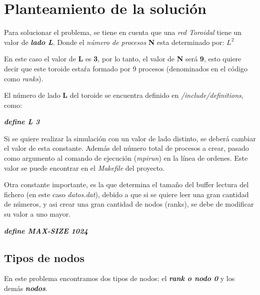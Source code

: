\documentclass[11pt]{article}
\begin{document}
\clearpage


\section{Planteamiento de la solución}
Para solucionar el problema, se tiene en cuenta que una \textit{red Toroidal} tiene un valor de \textit{\textbf{lado L}}.
Donde el \textit{número de procesos} \textbf{N} esta determinado por: \textbf{$L^{2}$}

En este caso el valor de \textbf{L} es \textbf{3}, por lo tanto, el valor de \textbf{N} será \textbf{9}, esto quiere decir que este toroide estaŕa formado por 9 procesos (denominados en el código como \textit{ranks}).

El número de lado \textbf{L} del toroide se encuentra definido en \textit{/include/definitions}, como:

\textit{\textbf{define L 3}}

Si se quiere realizar la simulación con un valor de lado distinto, se deberá cambiar el valor de esta constante. Además del número total de procesos a crear, pasado como argumento al comando de ejecución (\textit{mpirun}) en la línea de ordenes. Este valor se puede encontrar en el \textit{Makefile} del proyecto.

Otra constante importante, es la que determina el tamaño del buffer lectura del fichero (en este caso \textit{datos.dat}), debido a que si se quiere leer una gran cantidad de números, y asi crear una gran cantidad de nodos (ranks), se debe de modificar su valor a uno mayor.

\textit{\textbf{define MAX-SIZE 1024}}

\subsection{Tipos de nodos}
En este problema encontramos dos tipos de nodos: el \textbf{\textit{rank o nodo 0}} y los demás \textbf{\textit{nodos}}.
\end{document}
